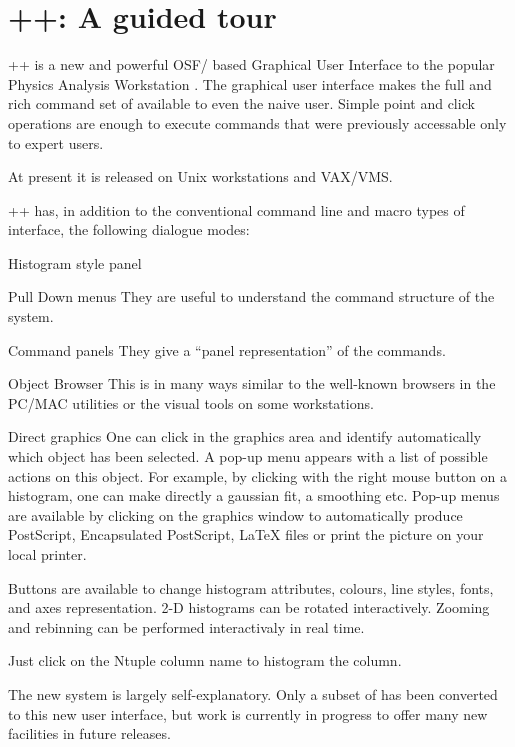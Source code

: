 \chapter{\PAW++: A guided tour}

\PAW++{} is a new and powerful OSF/\MOTIF{} based Graphical User Interface to
the popular Physics Analysis Workstation \XPAW.  The graphical user interface
makes the full and rich command set of \XPAW{} available to even the naive
user. Simple point and click operations are enough to execute commands that
were previously accessable only to expert users.

At present it is released on Unix workstations and VAX/VMS.

\PAW++{} has, in addition to the conventional command line and macro types of
interface, the following dialogue modes:

\begin{DL}{Histogram style panel}
\item[Pull Down menus] They are useful to understand the command structure of
      the \XPAW{} system.
\item[Command panels] They give a ``panel representation'' of the commands.
\item[Object Browser] This is in many ways similar to the well-known browsers
      in the PC/MAC utilities or the visual tools on some workstations.
\item[Direct graphics] One can click in the graphics area and identify
      automatically which object has been selected. A pop-up menu appears
      with a list of possible actions on this object. For example, by clicking
      with the right mouse button on a histogram, one can make directly a
      gaussian fit, a smoothing etc.
      Pop-up menus are available by clicking on the graphics window to
      automatically produce PostScript, Encapsulated PostScript, \LaTeX{} files
      or print the picture on your local printer.
\item[\HSP] Buttons are available to change
      histogram attributes, colours, line styles, fonts, and
      axes representation.
      2-D histograms can be rotated interactively. Zooming and rebinning can
      be performed interactivaly in real time.
\item[\NV] Just click on the Ntuple column name to histogram
      the column.
\end{DL}

The new system is largely self-explanatory. Only a subset of \XPAW{} has been
converted to this new user interface, but work is currently in progress to
offer many new facilities in future releases.

